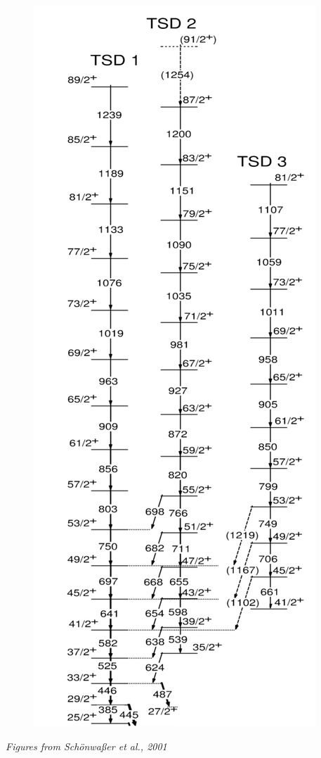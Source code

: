 \documentclass{beamer}
\begin{document}
\begin{frame}
\begin{figure}
    \includegraphics[scale=0.11]{Figs/collective-levels.pdf}
  \end{figure}
  \tiny{\textit{Figures from Schönwaßer et al., 2001}}
\end{frame}
\end{document}
